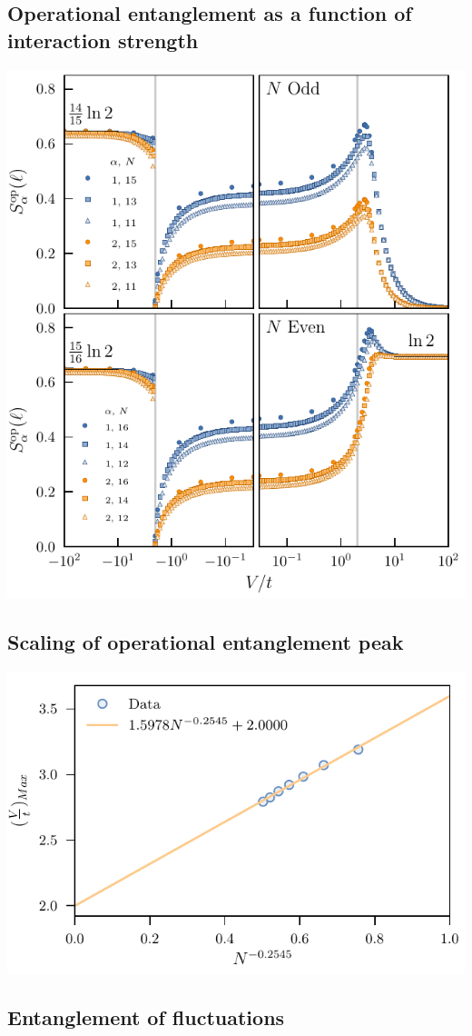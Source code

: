 	\subsection{Operational entanglement as a function of interaction strength}
		\includegraphics{Images/OperationalEntanglement/operationalEntanglementEntropies}
	\subsection{Scaling of operational entanglement peak}
	
		\includegraphics{Images/OperationalEntanglement/peakFitOddN_wLegend}
	\subsection{Entanglement of fluctuations}
	

